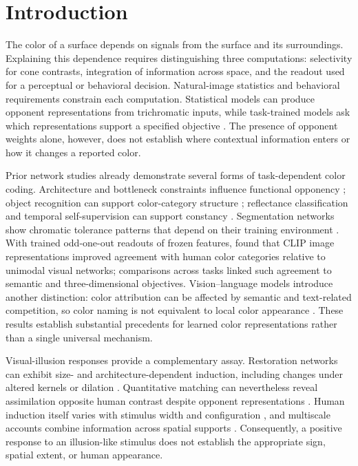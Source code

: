 \documentclass[authoryear,preprint,review,12pt]{elsarticle}
\begin{document}
\section{Introduction}\label{sec:intro}
The color of a surface depends on signals from the surface and its surroundings. Explaining this dependence requires distinguishing three computations: selectivity for cone contrasts, integration of information across space, and the readout used for a perceptual or behavioral decision. Natural-image statistics and behavioral requirements constrain each computation. Statistical models can produce opponent representations from trichromatic inputs, while task-trained models ask which representations support a specified objective \citep{barlow1961possible,simoncelli2001natural,tailor2000color,lee2002opponency}. The presence of opponent weights alone, however, does not establish where contextual information enters or how it changes a reported color.

Prior network studies already demonstrate several forms of task-dependent color coding. Architecture and bottleneck constraints influence functional opponency \citep{harris2021opponency}; object recognition can support color-category structure \citep{devries2022categorization}; reflectance classification and temporal self-supervision can support constancy \citep{flachot2022deep,ernst2024selfsup}. Segmentation networks show chromatic tolerance patterns that depend on their training environment \citep{hernandezcamara2024alignment}. With trained odd-one-out readouts of frozen features, \citet{akbarinia2025categorical} found that CLIP image representations improved agreement with human color categories relative to unimodal visual networks; comparisons across tasks linked such agreement to semantic and three-dimensional objectives. Vision--language models introduce another distinction: color attribution can be affected by semantic and text-related competition, so color naming is not equivalent to local color appearance \citep{arias2024clip}. These results establish substantial precedents for learned color representations rather than a single universal mechanism.

Visual-illusion responses provide a complementary assay. Restoration networks can exhibit size- and architecture-dependent induction, including changes under altered kernels or dilation \citep{gomezvilla2019deceived}. Quantitative matching can nevertheless reveal assimilation opposite human contrast despite opponent representations \citep{gomezvilla2020color}. Human induction itself varies with stimulus width and configuration \citep{canham2021size,kanematsu2022size}, and multiscale accounts combine information across spatial supports \citep{otazu2010chrom}. Consequently, a positive response to an illusion-like stimulus does not establish the appropriate sign, spatial extent, or human appearance.
\end{document}

